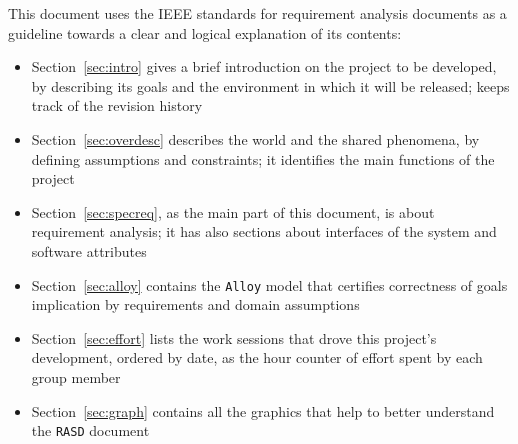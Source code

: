     This document uses the IEEE standards for requirement analysis documents as a guideline towards a clear and logical explanation of its contents:
    \begin{itemize}
      \item Section~\ref{sec:intro} gives a brief introduction on the project to be developed, by describing its goals and the environment in which it will be released; keeps track of the revision history
      \item Section~\ref{sec:overdesc} describes the world and the shared phenomena, by defining assumptions and constraints; it identifies the main functions of the project
      \item Section~\ref{sec:specreq}, as the main part of this document, is about requirement analysis; it has also sections about interfaces of the system and software attributes
      \item Section~\ref{sec:alloy} contains the \texttt{Alloy} model that certifies correctness of goals implication by requirements and domain assumptions
      \item Section~\ref{sec:effort} lists the work sessions that drove this project's development, ordered by date, as the hour counter of effort spent by each group member
     \item Section~\ref{sec:graph} contains all the graphics that help to better understand the \texttt{RASD} document
    \end{itemize}
